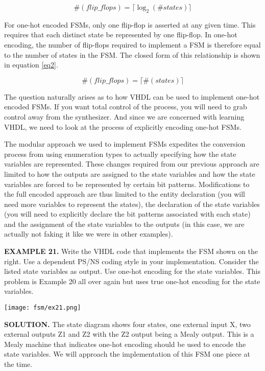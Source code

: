 \begin{equation}\label{eq1}
 \#(flip\_flops) = \lceil \log_2(\#states) \rceil
\end{equation}

For one-hot encoded FSMs, only one flip-flop is asserted at any given time. This requires that each distinct state be represented by one flip-flop. In one-hot encoding, the number of flip-flops required to implement a FSM is therefore equal to the number of states in the FSM. The closed form of this relationship is shown in equation \ref{eq2}. 

\begin{equation}\label{eq2}
 \#(flip\_flops) = \lceil \#(states) \rceil
\end{equation}

The question naturally arises as to how VHDL can be used to implement one-hot encoded FSMs. If you want total control of the process, you will need to grab control away from the synthesizer. And since we are concerned with learning VHDL, we need to look at the process of explicitly encoding one-hot FSMs. 

The modular approach we used to implement FSMs expedites the conversion process from using enumeration types to actually specifying how the state variables are represented. These changes required from our previous approach are limited to how the outputs are assigned to the state variables and how the state variables are forced to be represented by certain bit patterns. Modifications to the full encoded approach are thus limited to the entity declaration (you will need more variables to represent the states), the declaration of the state variables (you will need to explicitly declare the bit patterns associated with each state) and the assignment of the state variables to the outputs (in this case, we are actually not faking it like we were in other examples). 

\begin{leftbar}
\begin{minipage}[t]{0.5\textwidth}
\vspace{10pt}
\noindent
\textbf{EXAMPLE 21.}
Write the VHDL code that implements the FSM shown on the right. Use a dependent PS/NS coding style in your implementation. Consider the listed state variables as output. Use one-hot encoding for the state variables. This problem is Example 20 all over again but uses true one-hot encoding for the state variables. 
\vspace{50px}
\end{minipage}
\begin{minipage}[t]{0.47\textwidth}
\vspace{0pt}\raggedright
    \centering
	\texttt{[image: fsm/ex21.png]}
\end{minipage}
\end{leftbar}
\noindent
\textbf{SOLUTION.} The state diagram shows four states, one external input X, two external outputs Z1 and Z2 with the Z2 output being a Mealy output. This is a Mealy machine that indicates one-hot encoding should be used to encode the state variables. We will approach the implementation of this FSM one piece at the time.

